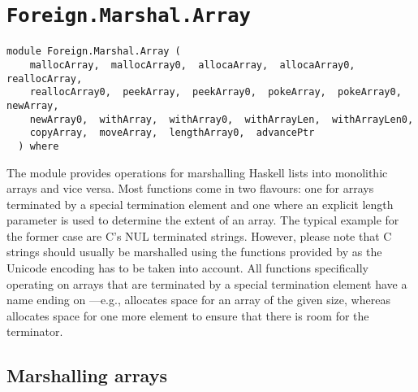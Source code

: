 \chapter{\texttt{Foreign.Marshal.Array}}
\label{module:Foreign.Marshal.Array}
\haddockbeginheader
{\haddockverb\begin{verbatim}
module Foreign.Marshal.Array (
    mallocArray,  mallocArray0,  allocaArray,  allocaArray0,  reallocArray, 
    reallocArray0,  peekArray,  peekArray0,  pokeArray,  pokeArray0,  newArray, 
    newArray0,  withArray,  withArray0,  withArrayLen,  withArrayLen0, 
    copyArray,  moveArray,  lengthArray0,  advancePtr
  ) where\end{verbatim}}
\haddockendheader

The module  provides operations for marshalling Haskell
lists into monolithic arrays and vice versa.  Most functions come in two
flavours: one for arrays terminated by a special termination element and one
where an explicit length parameter is used to determine the extent of an
array.  The typical example for the former case are C's NUL terminated
strings.  However, please note that C strings should usually be marshalled
using the functions provided by  as
the Unicode encoding has to be taken into account.  All functions specifically
operating on arrays that are terminated by a special termination element have
a name ending on ---e.g.,  allocates space for an
array of the given size, whereas  allocates space for one
more element to ensure that there is room for the terminator.
\par

\section{Marshalling arrays
}

